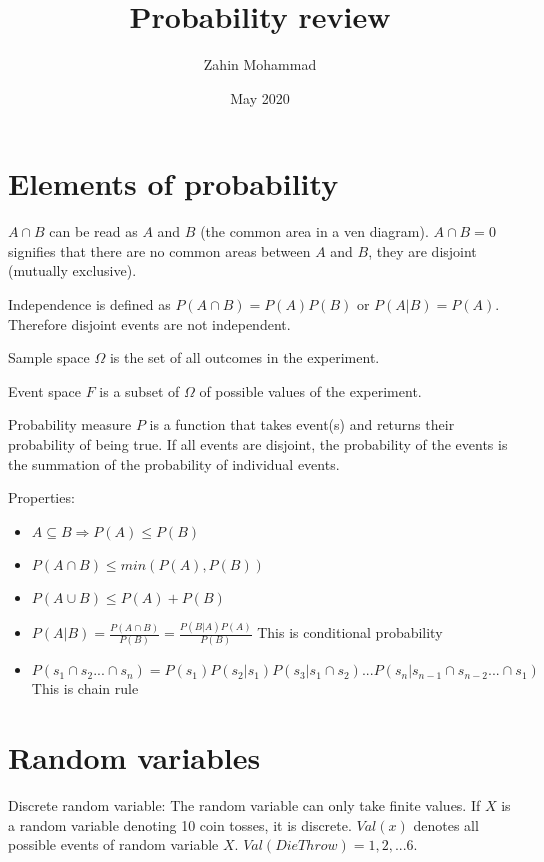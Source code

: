 \documentclass{article}
\title{Probability review}
\author{Zahin Mohammad}
\date{May 2020}
\begin{document}
\maketitle

\section{Elements of probability}

    $A \cap B$ can be read as $A$ and $B$ (the common area in a ven diagram).
    $A \cap B = 0$ signifies that there are no common areas between $A$ and $B$, they are disjoint (mutually exclusive).    
    \setlength{\parskip}{6pt}

    Independence is defined as $P(A \cap B) = P(A)P(B)$ or $P(A|B) = P(A)$. Therefore disjoint events are not independent.
    \setlength{\parskip}{6pt}

    Sample space $\Omega$ is the set of all outcomes in the experiment.
    \setlength{\parskip}{6pt}

    Event space $F$ is a subset of $\Omega$ of possible values of the experiment.
    \setlength{\parskip}{6pt}

    Probability measure $P$ is a function that takes event(s) and returns their probability of being true. If all events are disjoint, the probability of the events is the summation of the probability of individual events.
    \setlength{\parskip}{6pt}

    Properties:
    \begin{itemize}
        \item $A \subseteq B \Rightarrow P(A) \leq P(B)$
        \item $P(A \cap B) \leq min(P(A), P(B))$
        \item $P(A \cup B) \leq P(A) + P(B)$
        \item $P(A|B) = \frac{P(A \cap B)}{P(B)} = \frac{P(B|A)P(A)}{P(B)}$ This is conditional probability
        \item $P(s_1 \cap s_2 ... \cap s_n) = P(s_1)P(s_2|s_1)P(s_3|s_1 \cap s_2)...P(s_n|s_{n-1} \cap s_{n-2}... \cap s_1)$ This is chain rule
    \end{itemize}

\section{Random variables}

    Discrete random variable: The random variable can only take finite values. If $X$ is a random variable denoting 10 coin tosses, it is discrete. $Val(x)$ denotes all possible events of random variable $X$. $Val(Die Throw) = {1,2,...6}$.
    \setlength{\parskip}{6pt}
\end{document}
